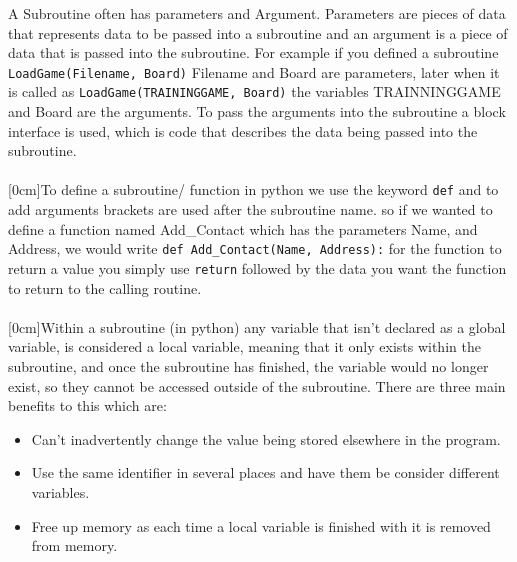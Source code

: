   A Subroutine often has parameters and Argument. Parameters are pieces of data that represents data to be passed into a subroutine and an argument is a piece of data that is passed into the subroutine. For example if you defined a subroutine \verb|LoadGame(Filename, Board)| Filename and Board are parameters, later when it is called as \verb|LoadGame(TRAININGGAME, Board)| the variables TRAINNINGGAME and Board are the arguments. To pass the arguments into the subroutine a block interface is used, which is code that describes the data being passed into the subroutine.\\ \\
  [0cm]To define a subroutine/ function in python we use the keyword \verb|def| and to add arguments brackets are used after the subroutine name. so if we wanted to define a function named Add\_Contact which has the parameters Name, and Address, we would write \verb|def Add_Contact(Name, Address):| for the function to return a value you simply use \verb|return| followed by the data you want the function to return to the calling routine.\\ \\
  [0cm]Within a subroutine (in python) any variable that isn't declared as a global variable, is considered a local variable, meaning that it only exists within the subroutine, and once the subroutine has finished, the variable would no longer exist, so they cannot be accessed outside of the subroutine. There are three main benefits to this which are:
  \begin{itemize}
    \setlength\itemsep{0em}
    \item Can't inadvertently change the value being stored elsewhere in the program.
    \item Use the same identifier in several places and have them be consider different variables.
    \item Free up memory as each time a local variable is finished with it is removed from memory.
  \end{itemize}

